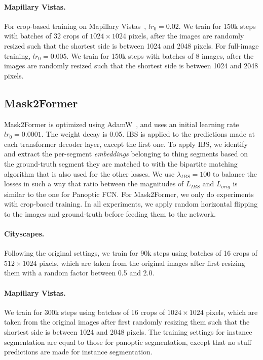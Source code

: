 \documentclass[10pt,twocolumn,letterpaper]{article}
\begin{document}
\paragraph{Mapillary Vistas.}
For crop-based training on Mapillary Vistas~\cite{neuhold2017mapillary}, $lr_0 = 0.02$. We train for 150k steps with batches of 32 crops of $1024\times1024$ pixels, after the images are randomly resized such that the shortest side is between 1024 and 2048 pixels. For full-image training, $lr_0 = 0.005$. We train for 150k steps with batches of 8 images, after the images are randomly resized such that the shortest side is between 1024 and 2048 pixels.

\subsection{Mask2Former}
Mask2Former is optimized using AdamW~\cite{loshchilov2019adamw}, and uses an initial learning rate $lr_0 = 0.0001$. The weight decay is 0.05. IBS is applied to the predictions made at each transformer decoder layer, except the first one. To apply IBS, we identify and extract the per-segment \textit{embeddings} belonging to thing segments based on the ground-truth segment they are matched to with the bipartite matching algorithm that is also used for the other losses. We use $\lambda_{IBS} = 100$ to balance the losses in such a way that ratio between the magnitudes of $L_{IBS}$ and $L_{orig}$ is similar to the one for Panoptic FCN. For Mask2Former, we only do experiments with crop-based training. In all experiments, we apply random horizontal flipping to the images and ground-truth before feeding them to the network.


\paragraph{Cityscapes.}
Following the original settings, we train for 90k steps using batches of 16 crops of $512\times1024$ pixels, which are taken from the original images after first resizing them with a random factor between 0.5 and 2.0.

\paragraph{Mapillary Vistas.}
We train for 300k steps using batches of 16 crops of $1024\times1024$ pixels, which are taken from the original images after first randomly resizing them such that the shortest side is between 1024 and 2048 pixels. The training settings for instance segmentation are equal to those for panoptic segmentation, except that no stuff predictions are made for instance segmentation. 
\end{document}
